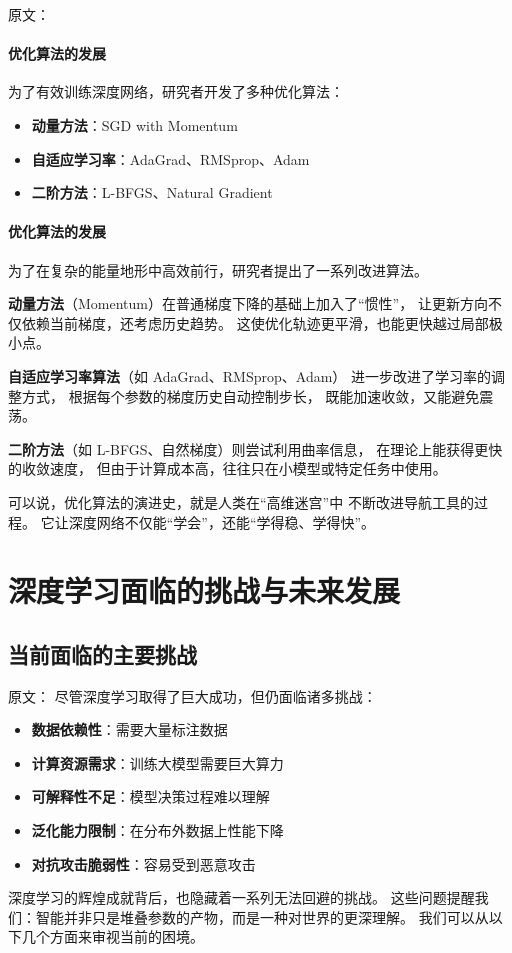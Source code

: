 原文：
\paragraph{优化算法的发展}
为了有效训练深度网络，研究者开发了多种优化算法：
\begin{itemize}
\item {\bf 动量方法}：SGD with Momentum
\item {\bf 自适应学习率}：AdaGrad、RMSprop、Adam
\item {\bf 二阶方法}：L-BFGS、Natural Gradient
\end{itemize}
\paragraph{优化算法的发展}  
为了在复杂的能量地形中高效前行，研究者提出了一系列改进算法。  

{\bf 动量方法}（Momentum）在普通梯度下降的基础上加入了“惯性”，  
让更新方向不仅依赖当前梯度，还考虑历史趋势。  
这使优化轨迹更平滑，也能更快越过局部极小点。  

{\bf 自适应学习率算法}（如 AdaGrad、RMSprop、Adam）  
进一步改进了学习率的调整方式，  
根据每个参数的梯度历史自动控制步长，  
既能加速收敛，又能避免震荡。  

{\bf 二阶方法}（如 L-BFGS、自然梯度）则尝试利用曲率信息，  
在理论上能获得更快的收敛速度，  
但由于计算成本高，往往只在小模型或特定任务中使用。  

可以说，优化算法的演进史，就是人类在“高维迷宫”中  
不断改进导航工具的过程。  
它让深度网络不仅能“学会”，还能“学得稳、学得快”。

\section{深度学习面临的挑战与未来发展}

\subsection{当前面临的主要挑战}

原文：
尽管深度学习取得了巨大成功，但仍面临诸多挑战：
\begin{itemize}
\item {\bf 数据依赖性}：需要大量标注数据
\item {\bf 计算资源需求}：训练大模型需要巨大算力
\item {\bf 可解释性不足}：模型决策过程难以理解
\item {\bf 泛化能力限制}：在分布外数据上性能下降
\item {\bf 对抗攻击脆弱性}：容易受到恶意攻击
\end{itemize}
深度学习的辉煌成就背后，也隐藏着一系列无法回避的挑战。  
这些问题提醒我们：智能并非只是堆叠参数的产物，而是一种对世界的更深理解。  
我们可以从以下几个方面来审视当前的困境。  

